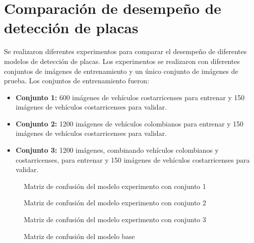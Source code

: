 \section{Comparación de desempeño de detección de placas}

Se realizaron diferentes experimentos para comparar el desempeño de
diferentes modelos de detección de placas. Los experimentos se
realizaron con diferentes conjuntos de imágenes de entrenamiento y
un único conjunto de imágenes de prueba. Los conjuntos de
entrenamiento fueron:

\begin{itemize}
\item \textbf{Conjunto 1:} 600 imágenes de vehículos costarricenses para entrenar
	y 150 imágenes de vehículos costarricenses para validar.
\item \textbf{Conjunto 2:} 1200 imágenes de vehículos colombianos para entrenar
	y 150 imágenes de vehículos costarricenses para validar.
\item \textbf{Conjunto 3:} 1200 imágenes, combinando vehículos colombianos y costarricenses, para entrenar
	y 150 imágenes de vehículos costarricenses para validar.
\end{itemize}

\begin{figure}[H]
	\caption{Matriz de confusión del modelo experimento con conjunto 1}
	\label{fig:yolo-confusion-exp1}
\end{figure}

\begin{figure}[H]
	\caption{Matriz de confusión del modelo experimento con conjunto 2}
	\label{fig:yolo-confusion-exp2}
\end{figure}

\begin{figure}[H]
	\caption{Matriz de confusión del modelo experimento con conjunto 3}
	\label{fig:yolo-confusion-exp3}
\end{figure}

\begin{figure}[H]
	\caption{Matriz de confusión del modelo base}
	\label{fig:yolo-confusion-base}
\end{figure}

